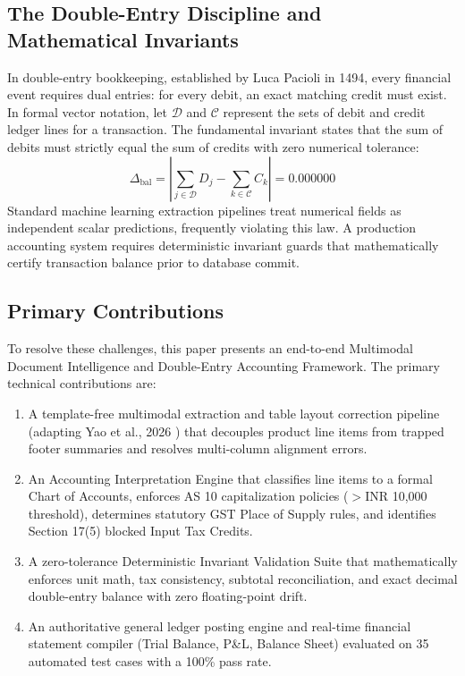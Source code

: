 \documentclass[conference]{IEEEtran}
\begin{document}
\subsection{The Double-Entry Discipline and Mathematical Invariants}
In double-entry bookkeeping, established by Luca Pacioli in 1494, every financial event requires dual entries: for every debit, an exact matching credit must exist. In formal vector notation, let $\mathcal{D}$ and $\mathcal{C}$ represent the sets of debit and credit ledger lines for a transaction. The fundamental invariant states that the sum of debits must strictly equal the sum of credits with zero numerical tolerance:
\begin{equation}
\Delta_{\text{bal}} = \left| \sum_{j \in \mathcal{D}} D_j - \sum_{k \in \mathcal{C}} C_k \right| = 0.000000
\end{equation}
Standard machine learning extraction pipelines treat numerical fields as independent scalar predictions, frequently violating this law. A production accounting system requires deterministic invariant guards that mathematically certify transaction balance prior to database commit.

\subsection{Primary Contributions}
To resolve these challenges, this paper presents an end-to-end Multimodal Document Intelligence and Double-Entry Accounting Framework. The primary technical contributions are:
\begin{enumerate}
    \item A template-free multimodal extraction and table layout correction pipeline (adapting Yao et al., 2026 \cite{yao2026multimodal}) that decouples product line items from trapped footer summaries and resolves multi-column alignment errors.
    \item An Accounting Interpretation Engine that classifies line items to a formal Chart of Accounts, enforces AS 10 capitalization policies ($>$INR 10,000 threshold), determines statutory GST Place of Supply rules, and identifies Section 17(5) blocked Input Tax Credits.
    \item A zero-tolerance Deterministic Invariant Validation Suite that mathematically enforces unit math, tax consistency, subtotal reconciliation, and exact decimal double-entry balance with zero floating-point drift.
    \item An authoritative general ledger posting engine and real-time financial statement compiler (Trial Balance, P\&L, Balance Sheet) evaluated on 35 automated test cases with a 100\% pass rate.
\end{enumerate}
\end{document}
